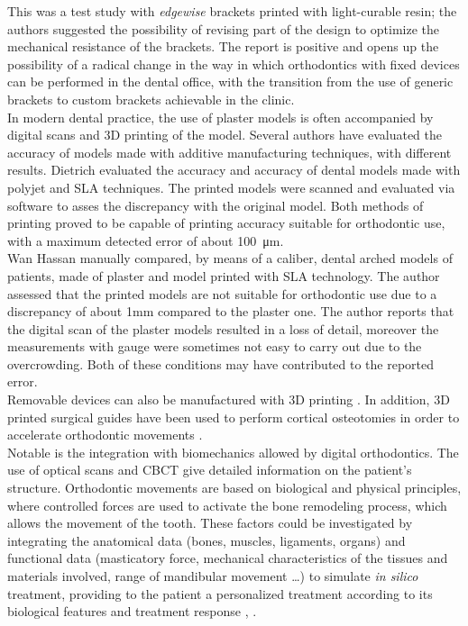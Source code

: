 This was a test study with \emph{edgewise} brackets printed with light-curable resin; the authors suggested the possibility of revising part of the design to optimize the mechanical resistance of the brackets. The report is positive and opens up the possibility of a radical change in the way in which orthodontics with fixed devices can be performed in the dental office, with the transition from the use of generic brackets to custom brackets achievable in the clinic.\\
In modern dental practice, the use of plaster models is often accompanied by digital scans and 3D printing of the model. Several authors have evaluated the accuracy of models made with additive manufacturing techniques, with different results. Dietrich \parencite{Reference112} evaluated the accuracy and accuracy of dental models made with polyjet and SLA techniques. The printed models were scanned and evaluated via software to asses the discrepancy with the original model. Both methods of printing proved to be capable of printing accuracy suitable for orthodontic use, with a maximum detected error of about \SI{100}{\micro\metre}. \\
Wan Hassan \parencite{Reference113} manually compared, by means of a caliber, dental arched models of patients, made of plaster and model printed with SLA technology. The author assessed that the printed models are not suitable for orthodontic use due to a discrepancy of about 1mm compared to the plaster one. The author reports that the digital scan of the plaster models resulted in a loss of detail, moreover the measurements with gauge were sometimes not easy to carry out due to the overcrowding. Both of these conditions may have contributed to the reported error. \\
Removable devices can also be manufactured with 3D printing \parencite{Reference111}. In addition, 3D printed surgical guides have been used to perform cortical osteotomies in order to accelerate orthodontic movements \parencite{Reference114}. \\
Notable is the integration with biomechanics allowed by digital orthodontics. The use of optical scans and CBCT give detailed information on the patient's structure. Orthodontic movements are based on biological and physical principles, where controlled forces are used to activate the bone remodeling process, which allows the movement of the tooth. These factors could be investigated by integrating the anatomical data (bones, muscles, ligaments, organs) and functional data (masticatory force, mechanical characteristics of the tissues and materials involved, range of mandibular movement \ldots) to simulate \emph{in silico} treatment, providing to the patient a personalized treatment according to its biological features and treatment response \parencite{Reference110}, \parencite{Reference140}.
